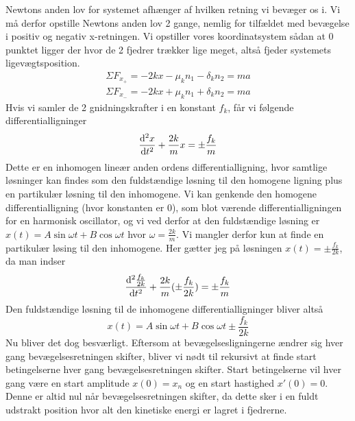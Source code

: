 Newtons anden lov for systemet afhænger af hvilken retning vi bevæger os i. 
Vi må derfor opstille Newtons anden lov 2 gange, nemlig for tilfældet med bevægelse i positiv og negativ x-retningen. 
Vi opstiller vores koordinatsystem sådan at 0 punktet ligger der hvor de 2 fjedrer trækker lige meget, altså fjeder systemets ligevægtsposition.
\begin{align*}
    \Sigma F_{x_+} = -2kx - \mu_k n_1 - \delta_k n_2 = ma\\
    \Sigma F_{x_-} = -2kx + \mu_k n_1 + \delta_k n_2 = ma
\end{align*}
Hvis vi samler de 2 gnidningskrafter i en konstant $f_k$, får vi følgende differentialligninger
\begin{equation}
    \odv[order=2]{x}{t} + \frac{2k}{m}x = \pm \frac{f_k}{m}
\end{equation}
Dette er en inhomogen lineær anden ordens differentialligning, hvor samtlige løsninger kan findes 
som den fuldstændige løsning til den homogene ligning plus en partikulær løsning til den inhomogene.
Vi kan genkende den homogene differentialligning (hvor konstanten er 0), som blot værende differentialligningen for en harmonisk oscillator, 
og vi ved derfor at den fuldstændige løsning er $x(t) = A\sin\omega t + B\cos\omega t$ hvor $\omega = \frac{2k}{m}$. Vi mangler derfor kun at finde en partikulær løsing til den inhomogene.
Her gætter jeg på løsningen $x(t) = \pm \frac{f_k}{2k}$, da man indser
\[
     \odv[order=2]{\frac{f_k}{2k}}{t} + \frac{2k}{m}(\pm\frac{f_k}{2k}) = \pm \frac{f_k}{m}
\]
Den fuldstændige løsning til de inhomogene differentialligninger bliver altså
\begin{equation}
    x(t) = A\sin\omega t + B\cos\omega t \pm \frac{f_k}{2k}
\end{equation}
Nu bliver det dog besværligt. Eftersom at bevægelsesligningerne ændrer sig hver gang bevægelsesretningen skifter, 
bliver vi nødt til rekursivt at finde start betingelserne hver gang bevægelsesretningen skifter.
Start betingelserne vil hver gang være en start amplitude $x(0) = x_n$ og en start hastighed $x'(0) = 0$. Denne er altid nul når bevægelsesretningen skifter, da dette sker i en fuldt udstrakt position hvor alt den kinetiske energi er lagret i fjedrerne.

